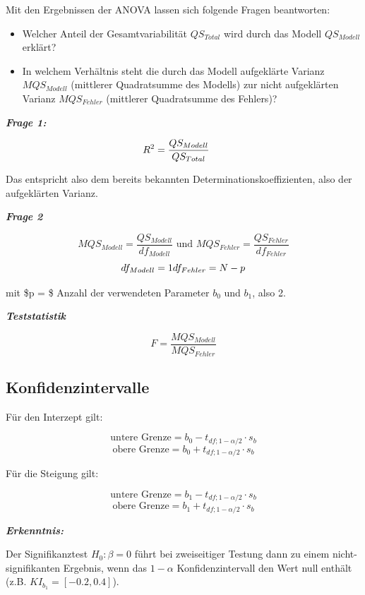 \documentclass[
]{article}
\providecommand{\tightlist}{%
  \setlength{\itemsep}{0pt}\setlength{\parskip}{0pt}}
\begin{document}
Mit den Ergebnissen der ANOVA lassen sich folgende Fragen beantworten:

\begin{itemize}
\tightlist
\item
  Welcher Anteil der Gesamtvariabilität \(QS_{Total}\) wird durch das Modell \(QS_{Modell}\) erklärt?
\item
  In welchem Verhältnis steht die durch das Modell aufgeklärte Varianz \(MQS_{Modell}\) (mittlerer Quadratsumme des Modells) zur nicht aufgeklärten Varianz \(MQS_{Fehler}\) (mittlerer Quadratsumme des Fehlers)?
\end{itemize}

\textbf{\emph{Frage 1:}}

\[R^2 = \frac{QS_{Modell}}{QS_{Total}} \hspace{.5cm}\]

Das entspricht also dem bereits bekannten Determinationskoeffizienten, also der aufgeklärten Varianz.

\textbf{\emph{Frage 2}}

\[MQS_{Modell} = \frac{QS_{Modell}}{df_{Modell}} \textrm{ und } MQS_{Fehler} = \frac{QS_{Fehler}}{df_{Fehler}}\]
\[df_{Modell} = 1 \\ df_{Fehler} = N - p\]

mit \$p = \$ Anzahl der verwendeten Parameter \(b_0\) und \(b_1\), also 2.

\textbf{\emph{Teststatistik}}

\[F = \frac{MQS_{Modell}}{MQS_{Fehler}}\]

\subsection*{Konfidenzintervalle}\label{konfidenzintervalle}

Für den Interzept gilt:

\[\textrm{untere Grenze} = b_0 - t_{df;1-\alpha/2} \cdot s_b\]
\[\textrm{obere Grenze}  = b_0 + t_{df;1-\alpha/2} \cdot s_b\]

Für die Steigung gilt:

\[\textrm{untere Grenze} = b_1 - t_{df;1-\alpha/2} \cdot s_b\]
\[\textrm{obere Grenze}  = b_1 + t_{df;1-\alpha/2} \cdot s_b\]

\textbf{\emph{Erkenntnis:}}

Der Signifikanztest \(H_0: \beta = 0\) führt bei zweiseitiger Testung dann zu einem nicht-signifikanten Ergebnis, wenn das \(1- \alpha\) Konfidenzintervall den Wert null enthält (z.B. \(KI_{b_1} = [-0.2, 0.4]\)).
\end{document}
